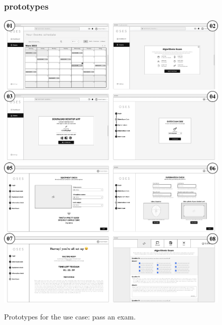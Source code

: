 \documentclass[]{uc2pfecaneva}
\begin{document}
    \begin{figure}[h]
        \subsubsection{prototypes}
        \centering
        \includegraphics[width=\textwidth]{images/prototypes_pass_exam1}
        \includegraphics[width=\textwidth]{images/prototypes_pass_exam2}

        \caption{Prototypes for the use case: pass an exam.}
    \end{figure}
    \clearpage
\end{document}
